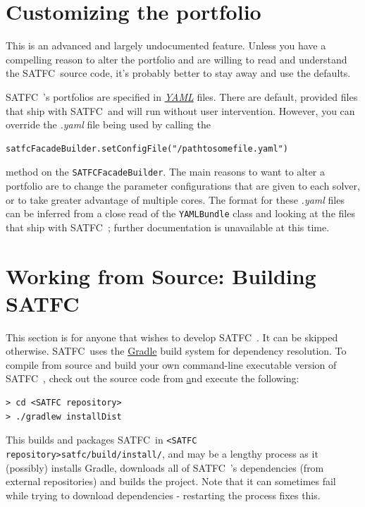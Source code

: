\documentclass[
10pt, %
letterpaper, %
oneside, %
headinclude,footinclude, %
BCOR5mm, %
needspace, %
]{scrartcl}
\newcommand{\SATFC}{\textsc{SATFC}~}
\begin{document}
\section{Customizing the portfolio}\label{sec:customportfolio}
\begin{fwarning}
    This is an advanced and largely undocumented feature. Unless you have a compelling reason to alter the portfolio and are willing to read and understand the \SATFC source code, it's probably better to stay away and use the defaults.
\end{fwarning}
\SATFC's portfolios are specified in \href{http://yaml.org/}{\emph{YAML}} files. There are default, provided files that ship with \SATFC and will run without user intervention. However, you can override the \emph{.yaml} file being used by calling the
\begin{verbatim}
satfcFacadeBuilder.setConfigFile("/pathtosomefile.yaml")
\end{verbatim}
method on the \texttt{SATFCFacadeBuilder}. The main reasons to want to alter a portfolio are to change the parameter configurations that are given to each solver, or to take greater advantage of multiple cores. The format for these \emph{.yaml} files can be inferred from a close read of the \texttt{YAMLBundle} class and looking at the files that ship with \SATFC; further documentation is unavailable at this time.

\section{Working from Source: Building \SATFC}

This section is for anyone that wishes to develop \SATFC. It can be skipped otherwise. \SATFC uses the \href{http://www.gradle.org/}{Gradle} build system for dependency resolution. To compile from source and build your own command-line executable version of \SATFC, check out the source code from \href{https://github.com/FCC/SATFC} and execute the following:
\begin{lstlisting}[style=Bash]
> cd <SATFC repository>
> ./gradlew installDist
\end{lstlisting}
This builds and packages \SATFC in \texttt{<SATFC repository>satfc/build/install/}, and may be a lengthy process as it (possibly) installs Gradle, downloads all of \SATFC's dependencies (from external repositories) and builds the project. Note that it can sometimes fail while trying to download dependencies - restarting the process fixes this.
\end{document}

